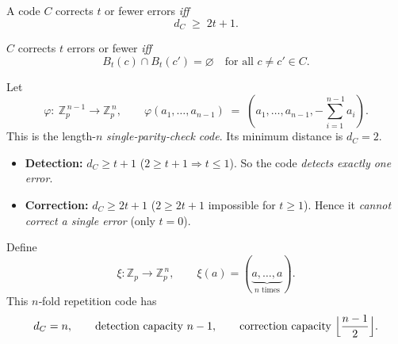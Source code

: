 \documentclass[docmute]{article}
\begin{document}
\begin{theorem}
A code $C$ corrects $t$ or fewer errors \emph{iff}
\[
  d_C \;\ge\; 2t+1.
\]
\end{theorem}

\begin{corollary}
$C$ corrects $t$ errors or fewer \emph{iff}
\[
  B_t(c)\cap B_t(c')=\varnothing
  \quad\text{for all } c\neq c'\in C.
\]
\end{corollary}

\begin{center}
\end{center}

\begin{example}
Let
\[
  \varphi:\ \mathbb Z_p^{\,n-1}\longrightarrow \mathbb Z_p^{\,n},
  \qquad
  \varphi(a_1,\dots,a_{n-1}) \;=\;
  (a_1,\dots,a_{n-1}, -\sum_{i=1}^{\,n-1}a_i).
\]
This is the length-$n$ \emph{single‐parity‐check code}.
Its minimum distance is $d_C=2$.

\begin{itemize}
  \item \textbf{Detection:} $d_C\ge t+1$ \;($2\ge t+1\Rightarrow t\le1$).
        So the code \emph{detects exactly one error}.
  \item \textbf{Correction:} $d_C\ge 2t+1$ \;($2\ge 2t+1$ impossible for
        $t\ge1$).  Hence it \emph{cannot correct a single error}
        (only $t=0$).
\end{itemize}
\end{example}

\begin{example}
Define
\[
  \xi : \mathbb Z_p \longrightarrow \mathbb Z_p^{\,n},
  \qquad
  \xi(a)=(\underbrace{a,\dots,a}_{n\text{ times}}).
\]
This $n$‐fold repetition code has
\[
  d_C=n,\qquad
  \text{detection capacity } n-1,\qquad
  \text{correction capacity }\Bigl\lfloor\frac{n-1}{2}\Bigr\rfloor.
\]
\end{example}
\end{document}
